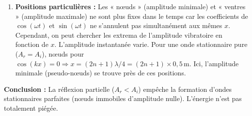 \documentclass[11pt]{article}
\begin{document}
\begin{exoresolu}
\begin{enumerate}
    $y(x,t) = 0,005 \cos(40\pi t)\cos(\pi x) + 0,035 \sin(40\pi t)\sin(\pi x)$.
    Ce n'est pas une onde stationnaire pure (pas de factorisation $X(x)T(t)$ simple avec des zéros fixes pour tout $t$). C'est un mélange d'onde stationnaire et progressive (onde stationnaire « imparfaite » car réflexion partielle $A_r \neq A_i$).
    \item \textbf{Positions particulières :} Les « nœuds » (amplitude minimale) et « ventres » (amplitude maximale) ne sont plus fixes dans le temps car les coefficients de $\cos(\omega t)$ et $\sin(\omega t)$ ne s'annulent pas simultanément aux mêmes $x$.
    Cependant, on peut chercher les extrema de l'amplitude vibratoire en fonction de $x$.
    L'amplitude instantanée varie. Pour une onde stationnaire pure ($A_r=A_i$), nœuds pour $\cos(kx)=0 \Rightarrow x = (2n+1)\lambda/4 = (2n+1)\times 0,5\,\text{m}$.
    Ici, l'amplitude minimale (pseudo-nœuds) se trouve près de ces positions.
\end{enumerate}
\textbf{Conclusion :} La réflexion partielle ($A_r < A_i$) empêche la formation d'ondes stationnaires parfaites (nœuds immobiles d'amplitude nulle). L'énergie n'est pas totalement piégée.
\end{exoresolu}
\end{document}
